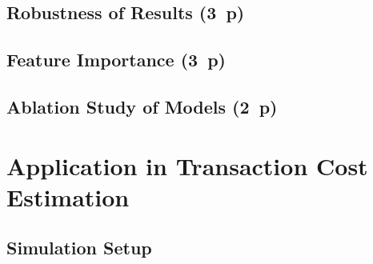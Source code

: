 \subsection{Robustness of Results (3~p)}\label{sec:robustness-checks}

\subsection{Feature Importance (3~p)}\label{sec:feature-importance}

\subsection{Ablation Study of Models (2~p)}\label{sec:ablation-study}

\newpage
\section{Application in Transaction Cost Estimation}\label{sec:application}
\subsection{Simulation Setup}\label{sec:simulation-setup}

